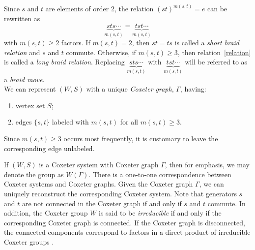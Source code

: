 Since $s$ and $t$ are elements of order 2, the relation $(st)^{m(s,t)}=e$ can be rewritten as 
\begin{equation}
\label{relation}
{\underbrace{sts \cdots }_{m(s,t)} } = {\underbrace{tst \cdots}_{m(s,t)}}
\end{equation}
 with $m(s,t)\ge 2$ factors.
If $m(s,t)=2$, then $st=ts$ is called a \emph{short braid relation} and $s$ and $t$ commute. Otherwise, if $m(s,t)\ge 3$, then relation~\ref{relation} is called a \emph{long braid relation}. Replacing $\underbrace{sts \cdots }_{m(s,t)}$ with $\underbrace{tst \cdots}_{m(s,t)}$ will be referred to as a \emph{braid move}.
\\

We can represent $(W,S)$ with a unique \emph{Coxeter graph}, $\Gamma$, having: 
\begin{enumerate}[leftmargin=0.6in]
\item vertex set $S$; 
\item edges $\{s,t\}$ labeled with $m(s,t)$ for all $m(s,t)\ge3$.
\end{enumerate}
Since $m(s,t)\ge 3$ occurs most frequently, it is customary to leave the corresponding edge unlabeled.


If $(W,S)$ is a Coxeter system with Coxeter graph $\Gamma$, then for emphasis, we may denote the group as $W(\Gamma)$. There is a one-to-one correspondence between Coxeter systems and Coxeter graphs. Given the Coxeter graph $\Gamma$, we can uniquely reconstruct the corresponding Coxeter system. Note that generators $s$ and $t$ are not connected in the Coxeter graph if and only if $s$ and $t$ commute. In addition, the Coxeter group $W$ is said to be \emph{irreducible} if and only if the corresponding Coxeter graph is connected. If the Coxeter graph is disconnected, the connected components correspond to factors in a direct product of irreducible Coxeter groups \cite[Section 2.2]{Humphreys.J:A}.
 

